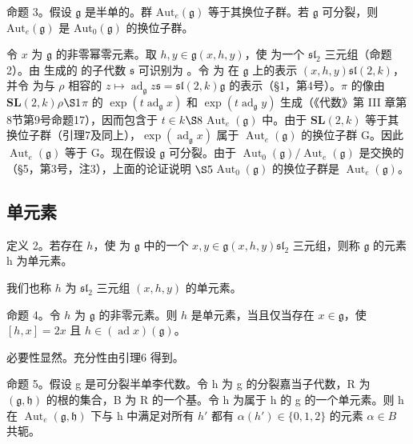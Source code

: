 命题 3。假设 \(\mathfrak{g}\) 是半单的。群 \(\mathrm{Aut}_e(\mathfrak{g})\) 等于其换位子群。若 \(\mathfrak{g}\) 可分裂，则 \(\mathrm{Aut}_e(\mathfrak{g})\) 是 \(\mathrm{Aut}_0(\mathfrak{g})\) 的换位子群。

令 \(x\) 为 \(\mathfrak{g}\) 的非零幂零元素。取 \(h, y \in \mathfrak{g}\)\((x, h, y)\)，使  为一个 \(\mathfrak{sl}_2\) 三元组（命题2）。由  生成的  的子代数 \(\mathfrak{s}\) 可识别为 。令  为  在 \(\mathfrak{g}\) 上的表示 \((x, h, y)\)\(\mathfrak{sl}(2, k)\)，并令  为与 \(\rho\) 相容的 \(z \mapsto \operatorname{ad}_{\mathfrak{g}} z\)\(\mathfrak{s} = \mathfrak{sl}(2, k)\)\(\mathfrak{g}\) 的表示（§1，第4号）。\(\pi\) 的像由 \(\mathbf{SL}(2, k)\)\(\rho\)\(\S 1\)\(\pi\) 的 \(\exp(t\operatorname{ad}_{\mathfrak{g}} x)\) 和 \(\exp(t\operatorname{ad}_{\mathfrak{g}} y)\) 生成（《代数》第 III 章第8节第9号命题17），因而包含于 \(t \in k\)\(\S 8\)\(\operatorname{Aut}_e(\mathfrak{g})\) 中。由于 \(\mathbf{SL}(2, k)\) 等于其换位子群（引理7及同上），\(\exp(\operatorname{ad}_{\mathfrak{g}} x)\) 属于 \(\operatorname{Aut}_e(\mathfrak{g})\) 的换位子群 G。因此 \(\operatorname{Aut}_e(\mathfrak{g})\) 等于 G。现在假设 \(\mathfrak{g}\) 可分裂。由于 \(\operatorname{Aut}_0(\mathfrak{g}) / \operatorname{Aut}_e(\mathfrak{g})\) 是交换的（§5，第3号，注3），上面的论证说明 \(\S 5\)\(\operatorname{Aut}_0(\mathfrak{g})\) 的换位子群是 \(\operatorname{Aut}_e(\mathfrak{g})\)。

\subsection{单元素}

定义 2。若存在 \(h\)，使  为 \(\mathfrak{g}\) 中的一个 \(x, y \in \mathfrak{g}\)\((x, h, y)\)\(\mathfrak{sl}_2\) 三元组，则称 \(\mathfrak{g}\) 的元素 h 为单元素。

我们也称 \(h\) 为 \(\mathfrak{sl}_2\) 三元组 \((x, h, y)\) 的单元素。

命题 4。令 \(h\) 为 \(\mathfrak{g}\) 的非零元素。则 \(h\) 是单元素，当且仅当存在 \(x \in \mathfrak{g}\)，使 \([h, x] = 2x\) 且 \(h \in (\operatorname{ad} x)(\mathfrak{g})\)。

必要性显然。充分性由引理6 得到。

命题 5。假设 g 是可分裂半单李代数。令 h 为 g 的分裂嘉当子代数，R 为 \((\mathfrak{g},\mathfrak{h})\) 的根的集合，B 为 R 的一个基。令 h 为属于 h 的 g 的一个单元素。则 h 在 \(\operatorname{Aut}_{e}(\mathfrak{g},\mathfrak{h})\) 下与 h 中满足对所有 \(h'\) 都有 \(\alpha(h') \in \{0,1,2\}\) 的元素 \(\alpha \in B\) 共轭。

